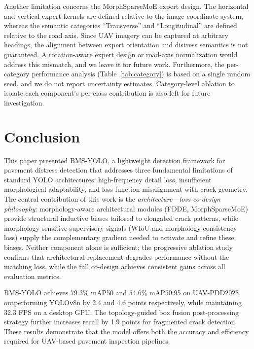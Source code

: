 \documentclass{ieeeaccess}
\begin{document}
Another limitation concerns the MorphSparseMoE expert design. The horizontal and vertical expert kernels are defined relative to the image coordinate system, whereas the semantic categories ``Transverse'' and ``Longitudinal'' are defined relative to the road axis. Since UAV imagery can be captured at arbitrary headings, the alignment between expert orientation and distress semantics is not guaranteed. A rotation-aware expert design or road-axis normalization would address this mismatch, and we leave it for future work. Furthermore, the per-category performance analysis (Table~\ref{tab:category}) is based on a single random seed, and we do not report uncertainty estimates. Category-level ablation to isolate each component's per-class contribution is also left for future investigation.

\section{Conclusion}
\label{sec:concl}

This paper presented BMS-YOLO, a lightweight detection framework for pavement distress detection that addresses three fundamental limitations of standard YOLO architectures: high-frequency detail loss, insufficient morphological adaptability, and loss function misalignment with crack geometry. The central contribution of this work is the \textit{architecture---loss co-design philosophy}: morphology-aware architectural modules (FDDE, MorphSparseMoE) provide structural inductive biases tailored to elongated crack patterns, while morphology-sensitive supervisory signals (WIoU and morphology consistency loss) supply the complementary gradient needed to activate and refine these biases. Neither component alone is sufficient; the progressive ablation study confirms that architectural replacement degrades performance without the matching loss, while the full co-design achieves consistent gains across all evaluation metrics.

BMS-YOLO achieves 79.3\% mAP50 and 54.6\% mAP50:95 on UAV-PDD2023, outperforming YOLOv8n by 2.4 and 4.6 points respectively, while maintaining 32.3 FPS on a desktop GPU. The topology-guided box fusion post-processing strategy further increases recall by 1.9 points for fragmented crack detection. These results demonstrate that the model offers both the accuracy and efficiency required for UAV-based pavement inspection pipelines.
\end{document}
